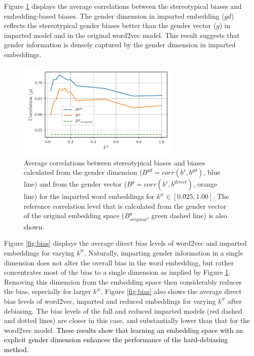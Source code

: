 \documentclass[11pt,a4paper]{article}
\begin{document}
Figure \ref{fig:corr} displays the average correlations between the stereotypical biases and embedding-based biases. The gender dimension in imparted embedding ($gd$) reflects the stereotypical gender biases better than the gender vector ($g$) in imparted model and in the original word2vec model. This result suggests that gender information is densely captured by the gender dimension in imparted embeddings.

\begin{figure}[h]
 	\centering
	\includegraphics[width=8.0cm]{Figures/gender_correlation.pdf}
	\caption{Average correlations between stereotypical biases and biases calculated from the gender dimension ($B^{gd} = corr(b^s, b^{gd})$, blue line) and from the gender vector ($B^g = corr(b^s, b^{direct})$, orange line) for the imparted word embeddings for $k^w \in [0.025,1.00]$. The reference correlation level that is calculated from the gender vector of the original embedding space ($B^g_{original}$, green dashed line) is also shown.}
	\label{fig:corr}
\end{figure}

 Figure \ref{fig:bias} displays the average direct bias levels of word2vec and imparted embeddings for varying $k^w$. Naturally, imparting gender information in a single dimension does not alter the overall bias in the word embedding, but rather concentrates most of the bias to a single dimension as implied by Figure \ref{fig:corr}. Removing this dimension from the embedding space then considerably reduces the bias, especially for larger $k^w$. Figure \ref{fig:bias} also shows the average direct bias levels of word2vec, imparted and reduced embeddings for varying $k^w$ after debiasing. The bias levels of the full and reduced imparted models (red dashed and dotted lines) are closer in this case, and substantially lower than that for the word2vec model. \textcolor{black}{These results show that learning an embedding space with an explicit gender dimension enhances the performance of the hard-debiasing method.}
\end{document}
